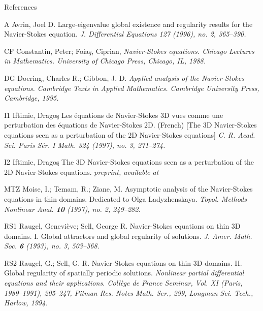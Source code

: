 \beginsection References

\frenchspacing


\item{A}
Avrin, Joel D. Large-eigenvalue global existence and regularity results for 
the Navier-Stokes equation. {\sl J. Differential Equations 127 (1996),
no. 2, 365--390.} 

\item{CF} Constantin, Peter; Foia\c s, Ciprian, {\sl Navier-Stokes equations.
Chicago Lectures in Mathematics. University of Chicago Press, Chicago, IL, 
1988.}

\item{DG}
Doering, Charles R.; Gibbon, J. D. {\sl Applied analysis of the Navier-Stokes 
equations. Cambridge Texts in Applied Mathematics. Cambridge
University Press, Cambridge, 1995.}

\item{I1}
Iftimie, Drago\c s Les \'equations de Navier-Stokes $3$D vues comme une 
perturbation des \'equations de Navier-Stokes $2$D. (French) [The
$3$D Navier-Stokes equations seen as a perturbation of the $2$D Navier-Stokes 
equations] {\sl C. R. Acad. Sci. Paris S\'er. I Math. 324 (1997), no. 3, 
271--274.}

\item{I2}
Iftimie, Drago\c s
The 3D Navier-Stokes equations seen as a 
perturbation of the 2D Navier-Stokes equations. {\sl preprint, available
at \hfill{}}

\item{MTZ}
Moise, I.; Temam, R.; Ziane, M. 
Asymptotic analysis of the Navier-Stokes equations in thin domains. 
Dedicated to Olga Ladyzhenskaya. 
{\sl Topol. Methods Nonlinear Anal. {\bf 10} (1997), no. 2, 249--282.}

\item{RS1}
Raugel, Genevi\`eve; Sell, George R. Navier-Stokes equations on thin 
$3$D domains. I. Global attractors and global regularity of solutions. 
{\sl J. Amer. Math. Soc. {\bf 6} (1993), no. 3, 503--568.}

\item{RS2}
Raugel, G.; Sell, G. R. Navier-Stokes equations on thin $3$D domains. II. 
Global regularity of spatially periodic solutions. 
{\sl Nonlinear partial
differential equations and their applications. Coll\`ege de France 
Seminar, Vol. XI (Paris, 1989--1991), 205--247, Pitman Res. 
Notes Math. Ser., 299, Longman Sci.
Tech., Harlow, 1994.}

